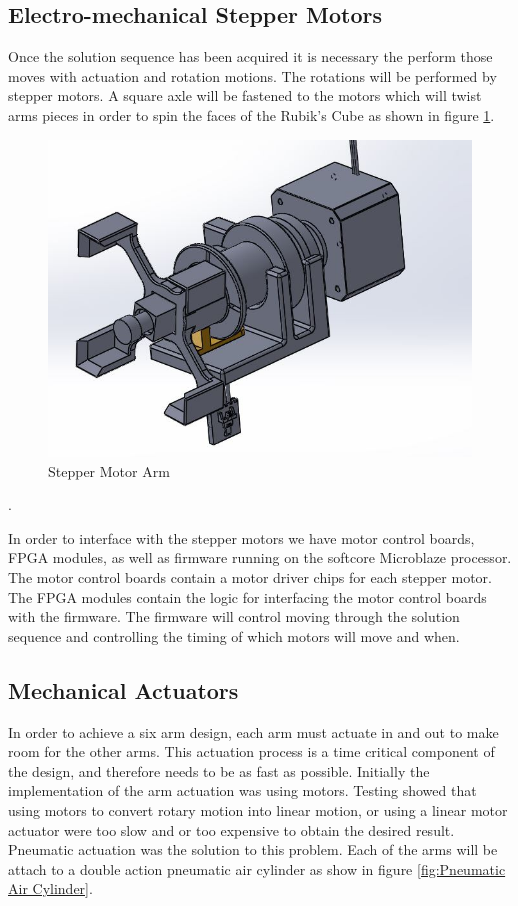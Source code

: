 \documentclass[11pt,english]{article}
\begin{document}
\subsection{Electro-mechanical Stepper Motors}
\label{sec:Stepper Motors}
Once the solution sequence has been acquired it is necessary the perform those moves with actuation and rotation motions.  The rotations will be performed by stepper motors.  A square axle will be fastened to the motors which will twist arms pieces in order to spin the faces of the Rubik's Cube as shown in figure \ref{fig:Stepper Motor Arm}.

\begin{figure}[!ht]
\centering
\includegraphics[scale=0.5]{StepperMotorArm.jpg}
\caption{Stepper Motor Arm}
\label{fig:Stepper Motor Arm}
\end{figure}. 

In order to interface with the stepper motors we have motor control boards, FPGA modules, as well as firmware running on the softcore Microblaze processor.  The motor control boards contain a motor driver chips for each stepper motor.  The FPGA modules contain the logic for interfacing the motor control boards with the firmware.  The firmware will control moving through the solution sequence and controlling the timing of which motors will move and when.

\subsection{Mechanical Actuators}
\label{sec:Mechanical Actuators}
In order to achieve a six arm design, each arm must actuate in and out to make
room for the other arms. This actuation process is a time critical component of
the design, and therefore needs to be as fast as possible.  Initially the
implementation of the arm actuation was using motors.  Testing showed that using
motors to convert rotary motion into linear motion, or using a linear motor
actuator were too slow  and or too expensive to obtain the desired result.
Pneumatic actuation was the solution to this problem.  Each of the arms will
be attach to a double action pneumatic air cylinder as show in
figure \ref{fig:Pneumatic Air Cylinder}.
\end{document}
